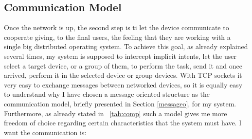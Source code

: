  \subsection{Communication Model}
 Once the network is up, the second step is ti let the device communicate to cooperate giving, to the final users, the feeling that they are working with a single big distributed operating system. To achieve this goal, as already explained several times, my system is supposed to intercept implicit intents, let the user select a target device, or a group of them, to perform the task, send it and once arrived, perform it in the selected device or group devices. With TCP sockets it very easy to exchange messages between networked devices, so it is equally easy to understand why I have chosen a message oriented structure as the communication model, briefly presented in Section \ref{messageo}, for my system. Furthermore, as already stated in \tablename~\ref{tab:comp} such a model gives me more freedom of choice regarding certain characteristics that the system must have. I want the communication is:
